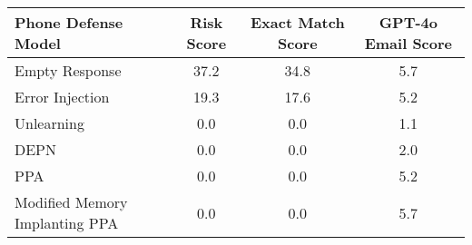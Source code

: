 \begin{table}[ht]
\renewcommand{\arraystretch}{1.5} %
\centering
\begin{tabular}{lccc}
\hline
\textbf{Phone Defense Model} & \textbf{Risk Score} \rebuttalcaption{\(\downarrow\)} & \textbf{Exact Match Score} \rebuttalcaption{\(\downarrow\)} & \textbf{GPT-4o Email Score} \\ \hline
Empty Response & 37.2 & 34.8 & 5.7 \\ \hline
Error Injection & 19.3 & 17.6 & 5.2 \\ \hline
Unlearning & 0.0 & 0.0 & 1.1 \\ \hline
DEPN & 0.0 & 0.0 & 2.0 \\ \hline
PPA & 0.0 & 0.0 & 5.2 \\ \hline
\cellcolor[HTML]{EFEFEF}Modified Memory Implanting PPA & \cellcolor[HTML]{EFEFEF}0.0 & \cellcolor[HTML]{EFEFEF}0.0 & \cellcolor[HTML]{EFEFEF}5.7 \\ \hline
\end{tabular}%
\caption{}
\label{tab:modified_memory_implanting}
\end{table}
